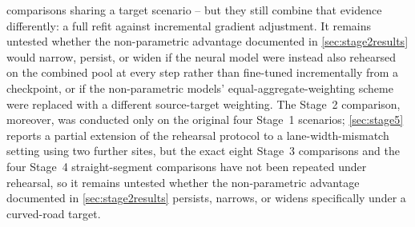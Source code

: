 \documentclass{iutbscthesis}
\begin{document}
comparisons sharing a target scenario -- but they still combine that evidence differently: a full refit against incremental gradient adjustment. It remains untested whether the non-parametric advantage documented in \autoref{sec:stage2results} would narrow, persist, or widen if the neural model were instead also rehearsed on the combined pool at every step rather than fine-tuned incrementally from a checkpoint, or if the non-parametric models' equal-aggregate-weighting scheme were replaced with a different source-target weighting. The Stage~2 comparison, moreover, was conducted only on the original four Stage~1 scenarios; \autoref{sec:stage5} reports a partial extension of the rehearsal protocol to a lane-width-mismatch setting using two further sites, but the exact eight Stage~3 comparisons and the four Stage~4 straight-segment comparisons have not been repeated under rehearsal, so it remains untested whether the non-parametric advantage documented in \autoref{sec:stage2results} persists, narrows, or widens specifically under a curved-road target.
\end{document}
